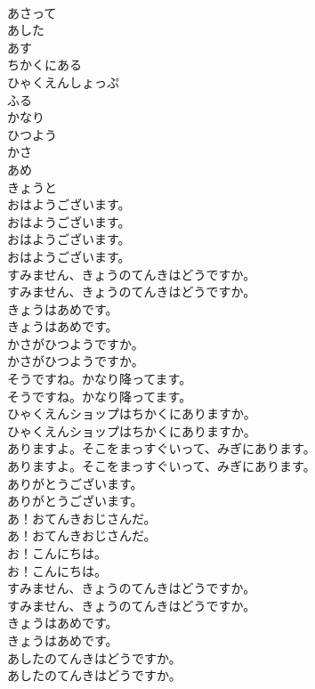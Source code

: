 \documentclass[8pt]{extreport}
\begin{document}
\begin{CJK}{UTF8}{min}
\\	あさって
\\	あした 
\\	あす
\\	ちかくにある
\\	ひゃくえんしょっぷ
\\	ふる
\\	かなり
\\	ひつよう
\\	かさ
\\	あめ
\\	きょうと
\\	おはようございます。	
\\	おはようございます。 
\\	おはようございます。	
\\	おはようございます。 
\\	すみません、きょうのてんきはどうですか。	
\\	すみません、きょうのてんきはどうですか。 
\\	きょうはあめです。	
\\	きょうはあめです。 
\\	かさがひつようですか。	
\\	かさがひつようですか。 
\\	そうですね。かなり降ってます。	
\\	そうですね。かなり降ってます。 
\\	ひゃくえんショップはちかくにありますか。	
\\	ひゃくえんショップはちかくにありますか。 
\\	ありますよ。そこをまっすぐいって、みぎにあります。	
\\	ありますよ。そこをまっすぐいって、みぎにあります。 
\\	ありがとうございます。	
\\	ありがとうございます。 
\\	あ！おてんきおじさんだ。	
\\	あ！おてんきおじさんだ。 
\\	お！こんにちは。	
\\	お！こんにちは。 
\\	すみません、きょうのてんきはどうですか。	
\\	すみません、きょうのてんきはどうですか。 
\\	きょうはあめです。	
\\	きょうはあめです。 
\\	あしたのてんきはどうですか。	
\\	あしたのてんきはどうですか。 

\end{CJK}
\end{document}
